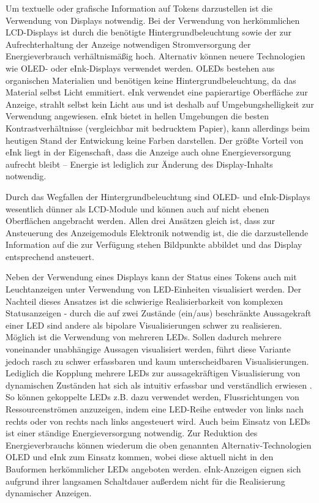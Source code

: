 Um textuelle oder grafische Information auf Tokens darzustellen ist die Verwendung von Displays notwendig. Bei der Verwendung von herkömmlichen \gls{LCD}-Displays ist durch die benötigte Hintergrundbeleuchtung sowie der zur Aufrechterhaltung der Anzeige notwendigen Stromversorgung der Energieverbrauch verhältnismäßig hoch. Alternativ können neuere Technologien wie \gls{OLED}- \citep{Shinar04} oder eInk-Displays \citep{Comiskey98} verwendet werden. \glspl{OLED} bestehen aus organischen Materialien und benötigen keine Hintergrundbeleuchtung, da das Material selbst Licht emmitiert. eInk verwendet eine papierartige Oberfläche zur Anzeige, strahlt selbst kein Licht aus und ist deshalb auf Umgebungshelligkeit zur Verwendung angewiesen. eInk bietet in hellen Umgebungen die besten Kontrastverhältnisse (vergleichbar mit bedrucktem Papier), kann allerdings beim heutigen Stand der Entwickung keine Farben darstellen. Der größte Vorteil von eInk liegt in der Eigenschaft, dass die Anzeige auch ohne Energieversorgung aufrecht bleibt -- Energie ist lediglich zur Änderung des Display-Inhalts notwendig.

Durch das Wegfallen der Hintergrundbeleuchtung sind \gls{OLED}- und eInk-Displays wesentlich dünner als \gls{LCD}-Module und können auch auf nicht ebenen Oberflächen angebracht werden. Allen drei Ansätzen gleich ist, dass zur Ansteuerung des Anzeigemoduls Elektronik notwendig ist, die die darzustellende Information auf die zur Verfügung stehen Bildpunkte abbildet und das Display entsprechend ansteuert.

Neben der Verwendung eines Displays kann der Status eines Tokens auch mit Leuchtanzeigen unter Verwendung von \gls{LED}-Einheiten visualisiert werden. Der Nachteil dieses Ansatzes ist die schwierige Realisierbarkeit von komplexen Statusanzeigen - durch die auf zwei Zustände (ein/aus) beschränkte Aussagekraft einer \gls{LED} sind andere als bipolare Visualisierungen schwer zu realisieren. Möglich ist die Verwendung von mehreren \glspl{LED}. Sollen dadurch mehrere voneinander unabhängige Aussagen visualisiert werden, führt diese Variante jedoch rasch zu schwer erfassbaren und kaum unterscheidbaren Visualisierungen. Lediglich die Kopplung mehrere \glspl{LED} zur aussagekräftigen Visualisierung von dynamischen Zuständen hat sich als intuitiv erfassbar und verständlich erwiesen \citep{Zuckerman05}. So können gekoppelte \glspl{LED} z.B. dazu verwendet werden, Flussrichtungen von Ressourcenströmen anzuzeigen, indem eine \gls{LED}-Reihe entweder von links nach rechts oder von rechts nach links angesteuert wird. Auch beim Einsatz von \glspl{LED} ist einer ständige Energieversorgung notwendig. Zur Reduktion des Energieverbrauchs können wiederum die oben genannten Alternativ-Technologien \gls{OLED} und eInk zum Einsatz kommen, wobei diese aktuell nicht in den Bauformen herkömmlicher \glspl{LED} angeboten werden. eInk-Anzeigen eignen sich aufgrund ihrer langsamen Schaltdauer außerdem nicht für die Realisierung dynamischer Anzeigen.

